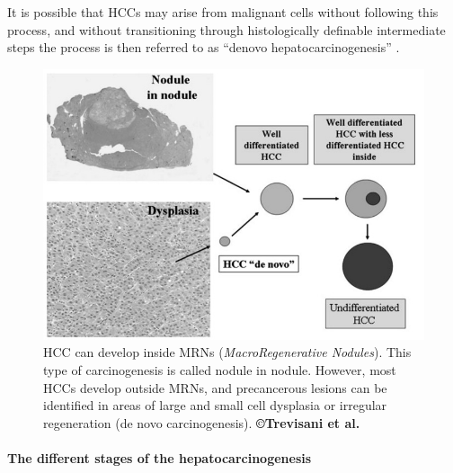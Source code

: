 It is possible that HCCs may arise from malignant cells without
following this process, and without transitioning through histologically
definable intermediate steps the process is then referred to as ``denovo
hepatocarcinogenesis'' \cite{Taguchi2002}.


\begin{figure}[th!]
\centering
\includegraphics[width=0.7\linewidth]{images/image3}
\caption{HCC can develop inside MRNs (\emph{MacroRegenerative Nodules}). This type of carcinogenesis is called nodule in nodule. However, most HCCs develop outside MRNs, and precancerous lesions can be identified in areas of large and small cell dysplasia or irregular regeneration (de novo carcinogenesis). \textbf{©Trevisani et al. \cite{Trevisani2008a}}}
\label{Trevisani2008_Fig2}
\end{figure}

\paragraph{The different stages of the hepatocarcinogenesis}

